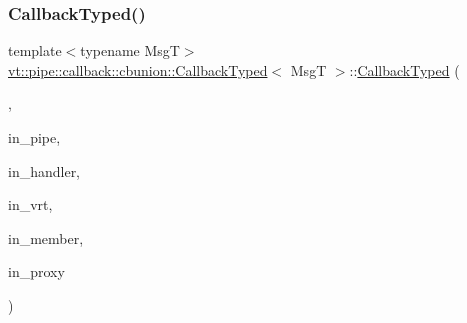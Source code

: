 \mbox{\label{structvt_1_1pipe_1_1callback_1_1cbunion_1_1_callback_typed_af5f0576f3858b3c81ebe3c4a28d3eca9}} 
\subsubsection{\texorpdfstring{Callback\+Typed()}{CallbackTyped()}\hspace{0.1cm}{\footnotesize\ttfamily [9/14]}}
{\footnotesize\ttfamily template$<$typename MsgT$>$ \\
\hyperlink{structvt_1_1pipe_1_1callback_1_1cbunion_1_1_callback_typed}{vt\+::pipe\+::callback\+::cbunion\+::\+Callback\+Typed}$<$ MsgT $>$\+::\hyperlink{structvt_1_1pipe_1_1callback_1_1cbunion_1_1_callback_typed}{Callback\+Typed} (\begin{DoxyParamCaption}\item[{Raw\+Bcast\+Col\+Dir\+Tag\+Type}]{,  }\item[{\hyperlink{namespacevt_ac9852acda74d1896f48f406cd72c7bd3}{Pipe\+Type} const \&}]{in\+\_\+pipe,  }\item[{\hyperlink{namespacevt_af64846b57dfcaf104da3ef6967917573}{Handler\+Type} const \&}]{in\+\_\+handler,  }\item[{\hyperlink{structvt_1_1pipe_1_1callback_1_1cbunion_1_1_callback_raw_base_single_a734a9c83099de5bc1cd85f9da8dba7bb}{Auto\+Handler\+Type} const \&}]{in\+\_\+vrt,  }\item[{bool const \&}]{in\+\_\+member,  }\item[{\hyperlink{namespacevt_a1b417dd5d684f045bb58a0ede70045ac}{Virtual\+Proxy\+Type} const \&}]{in\+\_\+proxy }\end{DoxyParamCaption})\hspace{0.3cm}{\ttfamily [inline]}}

\mbox{\label{structvt_1_1pipe_1_1callback_1_1cbunion_1_1_callback_typed_a9d258a1b9db65ef027a0e1185a9fe92e}} 
